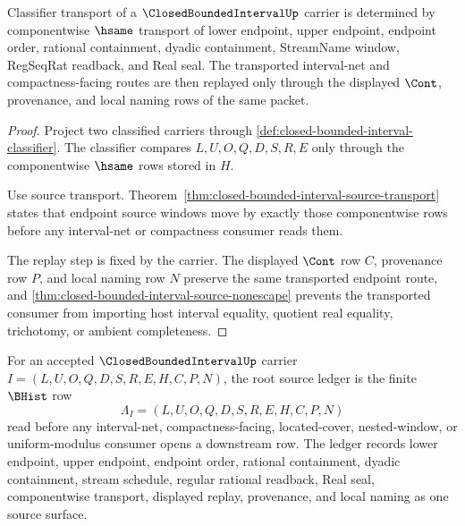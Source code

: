 \begin{theorem}
\label{thm:closedboundedinterval-endpoint-transport}
Classifier transport of a $\ClosedBoundedIntervalUp$ carrier is determined by componentwise $\hsame$ transport of lower endpoint, upper endpoint, endpoint order, rational containment, dyadic containment, StreamName window, RegSeqRat readback, and Real seal. The transported interval-net and compactness-facing routes are then replayed only through the displayed $\Cont$, provenance, and local naming rows of the same packet.
\end{theorem}
\begin{proof}
Project two classified carriers through \autoref{def:closed-bounded-interval-classifier}. The classifier compares $L,U,O,Q,D,S,R,E$ only through the componentwise $\hsame$ rows stored in $H$.

Use source transport. Theorem~\ref{thm:closed-bounded-interval-source-transport} states that endpoint source windows move by exactly those componentwise rows before any interval-net or compactness consumer reads them.

The replay step is fixed by the carrier. The displayed $\Cont$ row $C$, provenance row $P$, and local naming row $N$ preserve the same transported endpoint route, and \autoref{thm:closed-bounded-interval-source-nonescape} prevents the transported consumer from importing host interval equality, quotient real equality, trichotomy, or ambient completeness.
\end{proof}

\begin{definition}
\label{def:closed-bounded-interval-root-source-ledger}
For an accepted $\ClosedBoundedIntervalUp$ carrier $I=(L,U,O,Q,D,S,R,E,H,C,P,N)$, the root source ledger is the finite $\BHist$ row
$$
\Lambda_I=(L,U,O,Q,D,S,R,E,H,C,P,N)
$$
read before any interval-net, compactness-facing, located-cover, nested-window, or uniform-modulus consumer opens a downstream row. The ledger records lower endpoint, upper endpoint, endpoint order, rational containment, dyadic containment, stream schedule, regular rational readback, Real seal, componentwise transport, displayed replay, provenance, and local naming as one source surface.
\end{definition}


